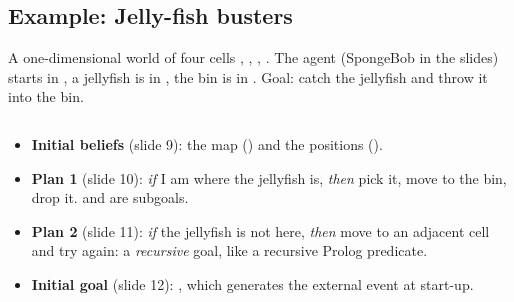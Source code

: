 \subsection{Example: Jelly-fish busters}
\label{sec:jellyfish-busters}

A one-dimensional world of four cells , , , . The agent
(SpongeBob in the slides) starts in , a jellyfish is in , the bin is in
. Goal: catch the jellyfish and throw it into the bin.

\begin{center}
\end{center}

\inputminted{prolog}{sections/bdi-agentspeak/jellyfish-busters/assets/jellyfish.asl}

\begin{itemize}[nosep]
  \item \textbf{Initial beliefs} (slide 9): the map () and the positions
        ().
  \item \textbf{Plan 1} (slide 10): \emph{if} I am where the jellyfish is, \emph{then} pick
        it, move to the bin, drop it.  and  are subgoals.
  \item \textbf{Plan 2} (slide 11): \emph{if} the jellyfish is not here, \emph{then} move to
        an adjacent cell and try again: a \emph{recursive} goal, like a recursive Prolog
        predicate.
  \item \textbf{Initial goal} (slide 12): , which generates the
        external event  at start-up.
\end{itemize}

